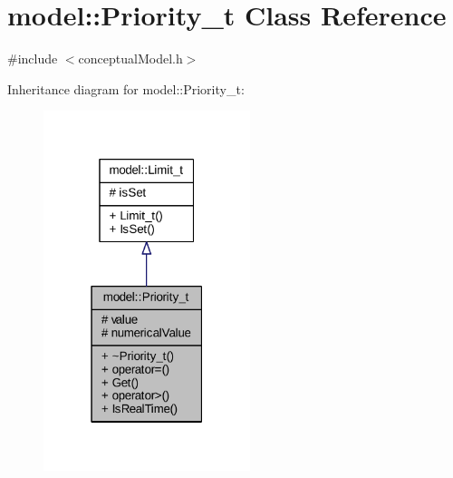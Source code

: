 \hypertarget{classmodel_1_1_priority__t}{}\section{model\+:\+:Priority\+\_\+t Class Reference}
\label{classmodel_1_1_priority__t}


{\ttfamily \#include $<$conceptual\+Model.\+h$>$}



Inheritance diagram for model\+:\+:Priority\+\_\+t\+:
\nopagebreak
\begin{figure}[H]
\begin{center}
\leavevmode
\includegraphics[width=171pt]{classmodel_1_1_priority__t__inherit__graph}
\end{center}
\end{figure}



